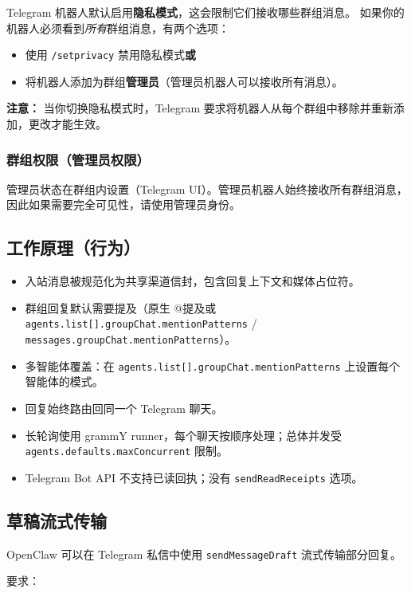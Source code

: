 Telegram 机器人默认启用\textbf{隐私模式}，这会限制它们接收哪些群组消息。
如果你的机器人必须看到\textit{所有}群组消息，有两个选项：

\begin{itemize}
  \item 使用 \texttt{/setprivacy} 禁用隐私模式\textbf{或}
  \item 将机器人添加为群组\textbf{管理员}（管理员机器人可以接收所有消息）。
\end{itemize}


\textbf{注意：} 当你切换隐私模式时，Telegram 要求将机器人从每个群组中移除并重新添加，更改才能生效。

\subsubsection{群组权限（管理员权限）}


管理员状态在群组内设置（Telegram UI）。管理员机器人始终接收所有群组消息，因此如果需要完全可见性，请使用管理员身份。

\subsection{工作原理（行为）}


\begin{itemize}
  \item 入站消息被规范化为共享渠道信封，包含回复上下文和媒体占位符。
  \item 群组回复默认需要提及（原生 @提及或 \texttt{agents.list[].groupChat.mentionPatterns} / \texttt{messages.groupChat.mentionPatterns}）。
  \item 多智能体覆盖：在 \texttt{agents.list[].groupChat.mentionPatterns} 上设置每个智能体的模式。
  \item 回复始终路由回同一个 Telegram 聊天。
  \item 长轮询使用 grammY runner，每个聊天按顺序处理；总体并发受 \texttt{agents.defaults.maxConcurrent} 限制。
  \item Telegram Bot API 不支持已读回执；没有 \texttt{sendReadReceipts} 选项。
\end{itemize}


\subsection{草稿流式传输}


OpenClaw 可以在 Telegram 私信中使用 \texttt{sendMessageDraft} 流式传输部分回复。

要求：

